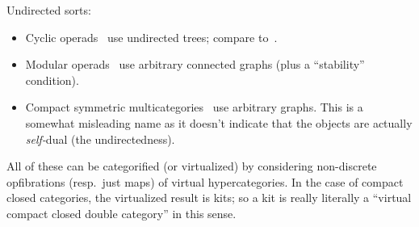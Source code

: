 \documentclass{article}
\theoremstyle{definition}
\theoremstyle{remark}
\begin{document}
Undirected sorts:
\begin{itemize}
\item Cyclic operads~\cite{gk:cyclic-operads} use undirected trees; compare to~\cite{co:flang-cyclic,co:cat-cyclic}.
\item Modular operads~\cite{gk:modular-operads} use arbitrary connected graphs (plus a ``stability'' condition).
\item Compact symmetric multicategories~\cite{jk:feynman} use arbitrary graphs.
  This is a somewhat misleading name as it doesn't indicate that the objects are actually \emph{self-}dual (the undirectedness).
\end{itemize}

All of these can be categorified (or virtualized) by considering non-discrete opfibrations (resp.\ just maps) of virtual hypercategories.
In the case of compact closed categories, the virtualized result is kits; so a kit is really literally a ``virtual compact closed double category'' in this sense.




\end{document}
